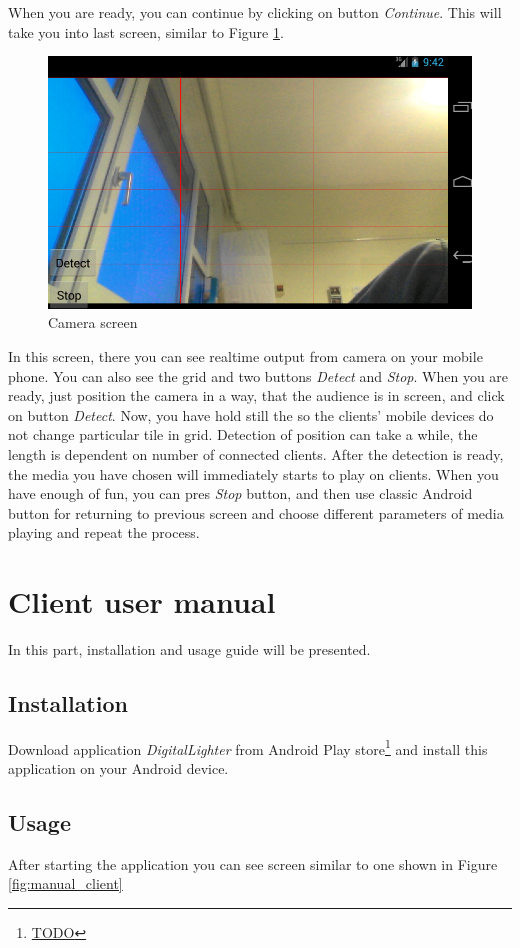 When you are ready, you can continue by clicking on button \emph{Continue}.
This will take you into last screen, similar to Figure \ref{fig:manual_server3}.
\begin{figure}[h]
	\centering
		\includegraphics[width=12cm]{appendix/server9.png}
	\caption{Camera screen}
	\label{fig:manual_server3}
\end{figure}

In this screen, there you can see realtime output from camera on your mobile phone.
You can also see the grid and two buttons \emph{Detect} and \emph{Stop}.
When you are ready, just position the camera in a way, that the audience is in screen, and click on button \emph{Detect}.
Now, you have hold still the so the clients' mobile devices do not change particular tile in grid.
Detection of position can take a while, the length is dependent on number of connected clients.
After the detection is ready, the media you have chosen will immediately starts to play on clients.
When you have enough of fun, you can pres \emph{Stop} button, and then use classic Android button for returning to previous screen and choose different parameters of media playing and repeat the process.

\chapter{Client user manual}
In this part, installation and usage guide will be presented.
\section{Installation}
Download application \emph{DigitalLighter} from Android Play store\footnote{\url{TODO}} and install this application on your Android device.
\section{Usage}
After starting the application you can see screen similar to one shown in Figure \ref{fig:manual_client}

